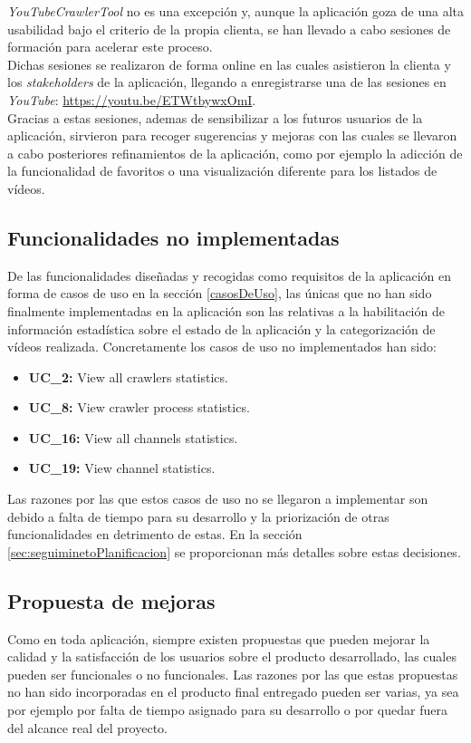 \documentclass[11pt,a4paper]{article}
\begin{document}
\textit{YouTubeCrawlerTool} no es una excepción y, aunque la aplicación goza de una alta usabilidad bajo el criterio de la propia clienta, se han llevado a cabo sesiones de formación para acelerar este proceso.
\\

Dichas sesiones se realizaron de forma online en las cuales asistieron la clienta y los \textit{stakeholders} de la aplicación, llegando a enregistrarse una de las sesiones en \textit{YouTube}: \url{https://youtu.be/ETWtbywxOmI}.
\\

Gracias a estas sesiones, ademas de sensibilizar a los futuros usuarios de la aplicación, sirvieron para recoger sugerencias y mejoras con las cuales se llevaron a cabo posteriores refinamientos de la aplicación, como por ejemplo la adicción de la funcionalidad de favoritos o una visualización diferente para los listados de vídeos.

\medskip 

\subsection{Funcionalidades no implementadas}
De las funcionalidades diseñadas y recogidas como requisitos de la aplicación en forma de casos de uso en la sección \ref{casosDeUso}, las únicas que no han sido finalmente implementadas en la aplicación son las relativas a la habilitación de información estadística sobre el estado de la aplicación y la categorización de vídeos realizada. Concretamente los casos de uso no implementados han sido:

\begin{itemize}
\item \textbf{UC\_2:} View all crawlers statistics.
\item \textbf{UC\_8:} View crawler process statistics.
\item \textbf{UC\_16:} View all channels statistics.
\item \textbf{UC\_19:} View channel statistics.
\end{itemize}

Las razones por las que estos casos de uso no se llegaron a implementar son debido a falta de tiempo para su desarrollo y la priorización de otras funcionalidades en detrimento de estas. En la sección \ref{sec:seguiminetoPlanificacion} se proporcionan más detalles sobre estas decisiones.

\medskip 

\subsection{Propuesta de mejoras}
Como en toda aplicación, siempre existen propuestas que pueden mejorar la calidad y la satisfacción de los usuarios sobre el producto desarrollado, las cuales pueden ser funcionales o no funcionales. Las razones por las que estas propuestas no han sido incorporadas en el producto final entregado pueden ser varias, ya sea por ejemplo por falta de tiempo asignado para su desarrollo o por quedar fuera del alcance real del proyecto.
\\
\end{document}
